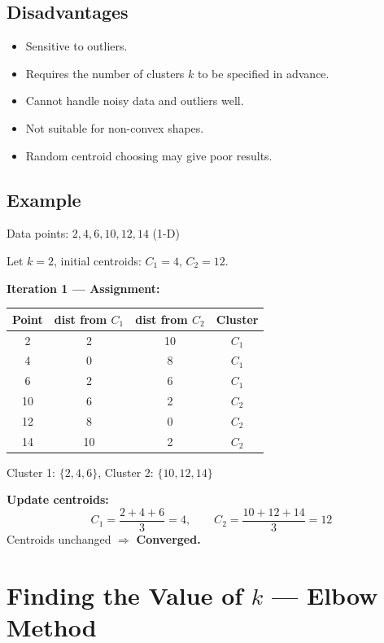 \documentclass[12pt,a4paper]{article}
\begin{document}
\subsection{Disadvantages}
\begin{itemize}
  \item Sensitive to outliers.
  \item Requires the number of clusters $k$ to be specified in advance.
  \item Cannot handle noisy data and outliers well.
  \item Not suitable for non-convex shapes.
  \item Random centroid choosing may give poor results.
\end{itemize}

\subsection{Example}

\begin{examplebox}
Data points: $2, 4, 6, 10, 12, 14$ \quad (1-D)\par
Let $k = 2$, initial centroids: $C_1 = 4$, $C_2 = 12$.

\vspace{0.5em}
\textbf{Iteration 1 --- Assignment:}
\begin{center}
\begin{tabular}{cccc}
\toprule
Point & dist from $C_1$ & dist from $C_2$ & Cluster \\
\midrule
2 & 2 & 10 & $C_1$ \\
4 & 0 & 8  & $C_1$ \\
6 & 2 & 6  & $C_1$ \\
10 & 6 & 2 & $C_2$ \\
12 & 8 & 0 & $C_2$ \\
14 & 10 & 2 & $C_2$ \\
\bottomrule
\end{tabular}
\end{center}

Cluster 1: $\{2,4,6\}$, Cluster 2: $\{10,12,14\}$

\textbf{Update centroids:}
\[
C_1 = \frac{2+4+6}{3} = 4, \qquad C_2 = \frac{10+12+14}{3} = 12
\]
Centroids unchanged $\Rightarrow$ \textbf{Converged.}
\end{examplebox}

\section{Finding the Value of \texorpdfstring{$k$}{k} --- Elbow Method}
\end{document}
